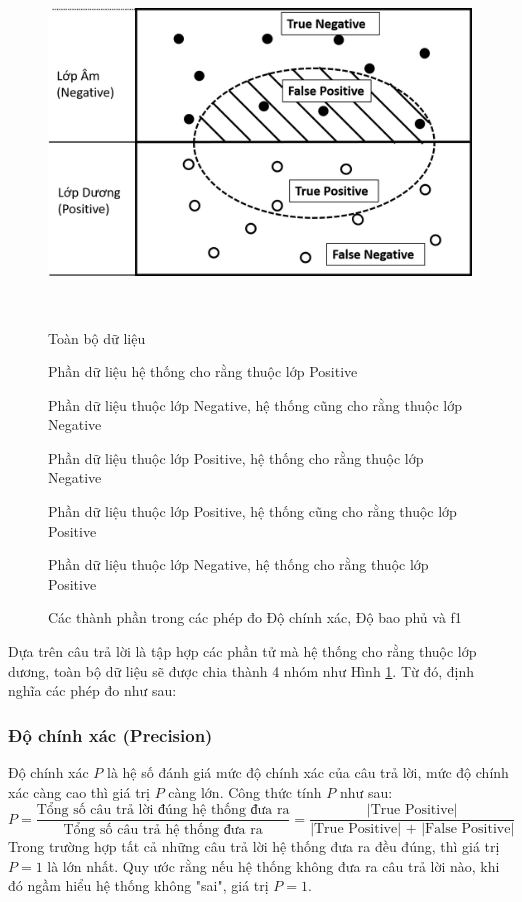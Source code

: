 \begin{figure}[H]
\centering
\begin{minipage}{0.9\textwidth}
\includegraphics[scale=0.35]{../hinh/phepdo.png}
{\footnotesize \\
\begin{description}[noitemsep]
\item[Hình chữ nhật] Toàn bộ dữ liệu 
\item[Hình eclip] Phần dữ liệu hệ thống cho rằng thuộc lớp Positive
\item[True Negative] Phần dữ liệu thuộc lớp Negative, hệ thống cũng cho rằng thuộc lớp Negative
\item[False Negative] Phần dữ liệu thuộc lớp Positive, hệ thống cho rằng thuộc lớp Negative
\item[True Positive] Phần dữ liệu thuộc lớp Positive, hệ thống cũng cho rằng thuộc lớp Positive
\item[False Positive] Phần dữ liệu thuộc lớp Negative, hệ thống cho rằng thuộc lớp Positive
\end{description}
\par}
\end{minipage}
\caption{Các thành phần trong các phép đo Độ chính xác, Độ bao phủ và f1}
\label{fig:phepdo}
\end{figure}

Dựa trên câu trả lời là tập hợp các phần tử mà hệ thống cho rằng thuộc lớp dương, toàn bộ dữ liệu sẽ được chia thành 4 nhóm như Hình \ref{fig:phepdo}. Từ đó, định nghĩa các phép đo như sau:
\subsubsection*{Độ chính xác (Precision)}
Độ chính xác \(P\) là hệ số đánh giá mức độ chính xác của câu trả lời, mức độ chính xác càng cao thì giá trị \(P\) càng lớn. Công thức tính \(P\) như sau:
$$P=\frac{\text{Tổng số câu trả lời đúng hệ thống đưa ra}}{\text{Tổng số câu trả hệ thống đưa ra}} = \frac{\text{|True Positive|}}{\text{|True Positive| + |False Positive|}}$$
Trong trường hợp tất cả những câu trả lời hệ thống đưa ra đều đúng, thì giá trị $P=1$ là lớn nhất. Quy ước rằng nếu hệ thống không đưa ra câu trả lời nào, khi đó ngầm hiểu hệ thống không "sai", giá trị $P=1$.
